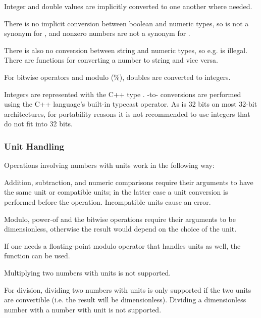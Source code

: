 {Integer and double values are implicitly converted to one another where needed.

There is no implicit conversion between boolean and numeric types, so 
is not a synonym for , and nonzero numbers are not a synonym
for .

There is also no conversion between string and numeric types, so e.g. 
is illegal. There are functions for converting a number to string and vice versa.

For bitwise operators and modulo (\%), doubles are converted to integers.

\begin{note}
Integers are represented with the C++ type . -to-
conversions are performed using the C++ language's built-in typecast operator.
As  is 32 bits on most 32-bit architectures, for portability reasons
it is not recommended to use integers that do not fit into 32 bits.
\end{note}


\subsubsection{Unit Handling}
\label{sec:ned-ref:unit-handling}

Operations involving numbers with units work in the following way:

Addition, subtraction, and numeric comparisons require their arguments to
have the same unit or compatible units; in the latter case a unit conversion
is performed before the operation. Incompatible units cause an error.


Modulo, power-of and the bitwise operations require their arguments to be
dimensionless, otherwise the result would depend on the choice of the unit.

\begin{note}
If one needs a floating-point modulo operator that handles units as well,
the  function can be used.
\end{note}

Multiplying two numbers with units is not supported.

For division, dividing two numbers with units is only supported if the two
units are convertible (i.e. the result will be dimensionless). Dividing
a dimensionless number with a number with unit is not supported.


}
